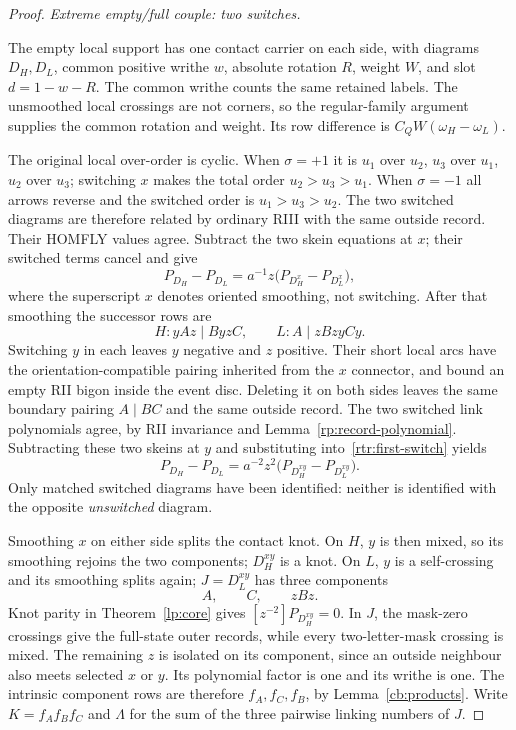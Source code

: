 \begin{proof}
\par\medskip\noindent\emph{Extreme empty/full couple: two switches.}\par
The empty local support has one contact carrier on each side,
with diagrams $D_H,D_L$, common positive writhe $w$, absolute
rotation $R$, weight $W$, and slot $d=1-w-R$. The common writhe
counts the same retained labels. The unsmoothed local crossings are
not corners, so the regular-family argument supplies the common
rotation and weight. Its row difference is
$C_QW(\omega_H-\omega_L)$.

The original local over-order is cyclic. When $\sigma=+1$ it is
$u_1$ over $u_2$, $u_3$ over $u_1$, $u_2$ over $u_3$; switching
$x$ makes the total order $u_2>u_3>u_1$. When $\sigma=-1$ all
arrows reverse and the switched order is $u_1>u_3>u_2$.
The two switched diagrams are therefore related by ordinary RIII
with the same outside record. Their HOMFLY values agree. Subtract
the two skein equations at $x$; their switched terms cancel and give
\begin{equation}\label{rtr:first-switch}
 P_{D_H}-P_{D_L}
   =a^{-1}z\bigl(P_{D_H^x}-P_{D_L^x}\bigr),
\end{equation}
where the superscript $x$ denotes oriented smoothing, not switching.
After that smoothing the successor rows are
\[
 H:yAz\mid ByzC,\qquad L:A\mid zBzyCy.
\]
Switching $y$ in each leaves $y$ negative and $z$ positive. Their
short local arcs have the orientation-compatible pairing inherited
from the $x$ connector, and bound an empty RII bigon inside the
event disc. Deleting it on both sides leaves the same boundary
pairing $A\mid BC$ and the same outside record. The two switched
link polynomials agree, by RII invariance and
Lemma~\ref{rp:record-polynomial}. Subtracting these two skeins at
$y$ and substituting into~\eqref{rtr:first-switch} yields
\begin{equation}\label{rtr:two-switches}
 P_{D_H}-P_{D_L}
   =a^{-2}z^2\bigl(P_{D_H^{xy}}-P_{D_L^{xy}}\bigr).
\end{equation}
Only matched switched diagrams have been identified: neither is
identified with the opposite \emph{unswitched} diagram.

Smoothing $x$ on either side splits the contact knot. On $H$, $y$
is then mixed, so its smoothing rejoins the two components;
$D_H^{xy}$ is a knot. On $L$, $y$ is a self-crossing and its
smoothing splits again; $J=D_L^{xy}$ has three components
\[
 A,\qquad C,\qquad zBz.
\]
Knot parity in Theorem~\ref{lp:core} gives
$[z^{-2}]P_{D_H^{xy}}=0$. In $J$, the mask-zero crossings give
the full-state outer records, while every two-letter-mask crossing
is mixed. The remaining $z$ is isolated on its component, since an
outside neighbour also meets selected $x$ or $y$. Its polynomial
factor is one and its writhe is one. The intrinsic component rows
are therefore $f_A,f_C,f_B$, by Lemma~\ref{cb:products}.
Write $K=f_Af_Bf_C$ and $\Lambda$ for the sum of the three pairwise
linking numbers of $J$.


\end{proof}
